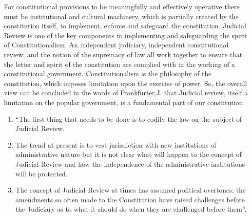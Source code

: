\begin{multicols}{2}
\vspace{-.1cm}

\noi
For constitutional provisions to be meaningfully and effectively operative there must be
institutional and cultural machinery, which is partially created by the constitution itself, to
implement, enforce and safeguard the constitution. Judicial Review is one of the key
components in implementing and safeguarding the spirit of Constitutionalism. An
independent judiciary, independent constitutional review, and the notion of the supremacy of
law all work together to ensure that the letter and spirit of the constitution are complied with
in the working of a constitutional government. Constitutionalism is the philosophy of the
constitution, which imposes limitation upon the exercise of power. So, the overall view can
be concluded in the words of Frankfurter,J. that Judicial review, itself a limitation on the
popular government, is a fundamental part of our constitution.



\vspace{-.2cm}

\noi
\begin{enumerate}
\itemsep=0pt

\item “The first thing that needs to be done is to codify the law on the subject of Judicial
Review.

\item The trend at present is to vest jurisdiction with new institutions of administrative
nature but it is not clear what will happen to the concept of Judicial Review and how
the independence of the administrative institutions will be protected.

\item The concept of Judicial Review at times has assumed political overtones; the
amendments so often made to the Constitution have raised challenges before the
Judiciary as to what it should do when they are challenged before them”.
\end{enumerate}

\end{multicols}
\label{end2020-art8}
